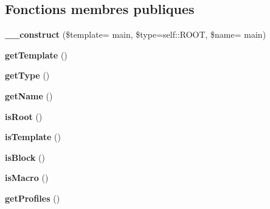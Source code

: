 \subsection*{Fonctions membres publiques}
\begin{DoxyCompactItemize}
\item 
{\bfseries \+\_\+\+\_\+construct} (\$template= \textquotesingle{}main\textquotesingle{}, \$type=self\+::\+R\+O\+OT, \$name= \textquotesingle{}main\textquotesingle{})\hypertarget{class_twig___profiler___profile_a9b2b64dd3388964eb5c5b76efc8639f2}{}\label{class_twig___profiler___profile_a9b2b64dd3388964eb5c5b76efc8639f2}

\item 
{\bfseries get\+Template} ()\hypertarget{class_twig___profiler___profile_a5d9dc4ee2d6563ea86a5d8f4d450d124}{}\label{class_twig___profiler___profile_a5d9dc4ee2d6563ea86a5d8f4d450d124}

\item 
{\bfseries get\+Type} ()\hypertarget{class_twig___profiler___profile_a830b5c75df72b32396701bc563fbe3c7}{}\label{class_twig___profiler___profile_a830b5c75df72b32396701bc563fbe3c7}

\item 
{\bfseries get\+Name} ()\hypertarget{class_twig___profiler___profile_a3d0963e68bb313b163a73f2803c64600}{}\label{class_twig___profiler___profile_a3d0963e68bb313b163a73f2803c64600}

\item 
{\bfseries is\+Root} ()\hypertarget{class_twig___profiler___profile_a846a3636e0fd9960ac164258af6d3552}{}\label{class_twig___profiler___profile_a846a3636e0fd9960ac164258af6d3552}

\item 
{\bfseries is\+Template} ()\hypertarget{class_twig___profiler___profile_a965825ba500d5526200b008e4f5f3029}{}\label{class_twig___profiler___profile_a965825ba500d5526200b008e4f5f3029}

\item 
{\bfseries is\+Block} ()\hypertarget{class_twig___profiler___profile_a8d8566f1bbdbb0cad606c303f07c062f}{}\label{class_twig___profiler___profile_a8d8566f1bbdbb0cad606c303f07c062f}

\item 
{\bfseries is\+Macro} ()\hypertarget{class_twig___profiler___profile_afed616c177c7b39421fd84ecbc2659a0}{}\label{class_twig___profiler___profile_afed616c177c7b39421fd84ecbc2659a0}

\item 
{\bfseries get\+Profiles} ()\hypertarget{class_twig___profiler___profile_a927651326409d58d7f147af4f68615bd}{}\label{class_twig___profiler___profile_a927651326409d58d7f147af4f68615bd}


\end{DoxyCompactItemize}
